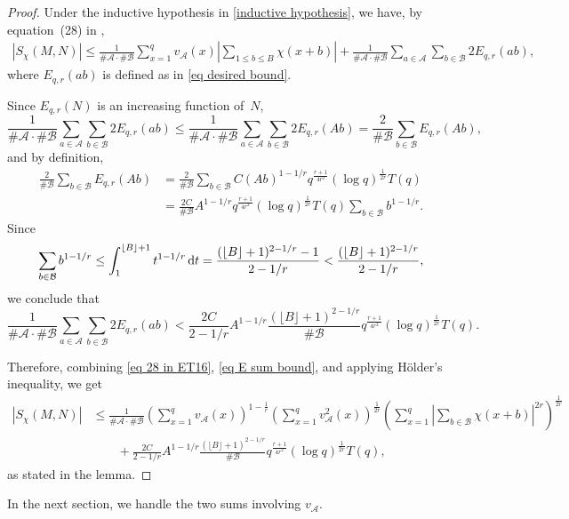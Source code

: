 \documentclass[12pt]{amsart}
\theoremstyle{plain}
\theoremstyle{definition}
\newcommand{\cA}{{\mathcal{A}}}
\newcommand{\cB}{{\mathcal{B}}}
\begin{document}
\begin{proof}
Under the inductive hypothesis in \eqref{inductive hypothesis}, we have,
by equation~(28) in \cite{ET2},
\begin{align}\label{eq 28 in ET16}
      \left|  S_\chi\left(M, N\right)\right| 
       \le 
       \frac{1}{\#\cA\cdot \#\cB}\sum_{x=1}^{q}v_\cA(x)\left|\sum_{1\le b \le B}\chi(x+b)\right| +
    \frac{1}{\#\cA\cdot \#\cB}\sum_{a\in \cA}\sum_{b\in \cB}2E_{q,r}(ab),
    \end{align}
where $E_{q,r}(ab)$ is defined as in \eqref{eq desired bound}.

Since $E_{q,r}(N)$ is an increasing function of~$N$,
\[
\frac{1}{\#\cA\cdot \#\cB}\sum_{a\in \cA}\sum_{b\in \cB}2E_{q,r}(ab) \le \frac{1}{\#\cA\cdot \#\cB}\sum_{a\in \cA}\sum_{b\in \cB}2E_{q,r}(Ab) = \frac{2}{\#\cB}\sum_{b\in \cB} E_{q,r}(Ab),
\]
and by definition,
\begin{align*}
\frac{2}{\#\cB}\sum_{b\in \cB} E_{q,r}(Ab) &= \frac{2}{\#\cB}\sum_{b\in \cB} C (Ab)^{1-1/r} q^{\frac{r+1}{4r^2}} (\log q)^{\frac{1}{2r}} T(q) \\
&= \frac{2C}{\#\cB} A^{1-1/r} q^{\frac{r+1}{4r^2}} (\log q)^{\frac{1}{2r}} T(q) \sum_{b\in \cB} b^{1-1/r}.
\end{align*}
Since
\[
\sum_{b\in \cB} b^{1-1/r} \le \int_1^{\lfloor B\rfloor+1} t^{1-1/r} \,{\rm d}t = \frac{(\lfloor B\rfloor+1)^{2-1/r}-1}{2-1/r} < \frac{(\lfloor B\rfloor+1)^{2-1/r}}{2-1/r},
\]
we conclude that
\begin{equation} \label{eq E sum bound}
\frac{1}{\#\cA\cdot \#\cB}\sum_{a\in \cA}\sum_{b\in \cB}2E_{q,r}(ab) < \frac{2C}{2-1/r} A^{1-1/r} \frac{(\lfloor B\rfloor+1)^{2-1/r}}{\#\cB} q^{\frac{r+1}{4r^2}} (\log q)^{\frac{1}{2r}} T(q).
\end{equation}

Therefore, combining \eqref{eq 28 in ET16}, \eqref{eq E sum bound}, and applying H{\"o}lder's inequality, we get
\begin{align*}
    \left|  S_\chi\left(M, N\right)\right|
    &\le
    \frac{1}{\#\cA\cdot \#\cB}\left(\sum_{x=1}^q v_\cA(x)\right)^{1-\frac{1}{r}}
    \left(\sum_{x=1}^q v^2_{\cA}(x)\right)^{\frac{1}{2r}}\left(\sum_{x=1}^q\left|\sum_{b \in \cB}\chi\left(x+b\right)\right|^{2r}\right)^\frac{1}{2r}
    \\
    &\qquad{}+
\frac{2C}{2-1/r} A^{1-1/r} \frac{(\lfloor B\rfloor+1)^{2-1/r}}{\#\cB} q^{\frac{r+1}{4r^2}} (\log q)^{\frac{1}{2r}} T(q),   
\end{align*}
as stated in the lemma.
\end{proof}
In the next section, we handle the two sums involving $v_{\cA}$.
\end{document}
